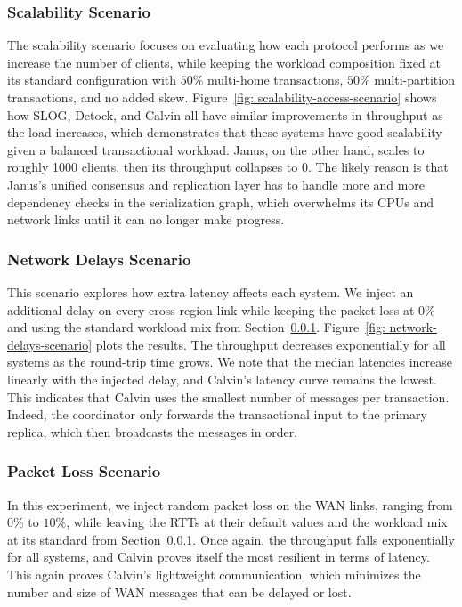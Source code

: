 \subsubsection{Scalability Scenario}
\label{subsubsec: scalability-scenario}
The scalability scenario focuses on evaluating how each protocol performs as we increase the number of clients, while keeping the workload composition fixed at its standard configuration with $50\%$ multi-home transactions, $50\%$ multi-partition transactions, and no added skew. Figure~\ref{fig: scalability-access-scenario} shows how SLOG, Detock, and Calvin all have similar improvements in throughput as the load increases, which demonstrates that these systems have good scalability given a balanced transactional workload. Janus, on the other hand, scales to roughly 1000 clients, then its throughput collapses to 0. The likely reason is that Janus's unified consensus and replication layer has to handle more and more dependency checks in the serialization graph, which overwhelms its CPUs and network links until it can no longer make progress.

\subsubsection{Network Delays Scenario}
\label{subsubsec: network-delays-scenario}
This scenario explores how extra latency affects each system. We inject an additional delay on every cross-region link while keeping the packet loss at $0\%$ and using the standard workload mix from Section~\ref{subsubsec: scalability-scenario}. Figure~\ref{fig: network-delays-scenario} plots the results. The throughput decreases exponentially for all systems as the round-trip time grows. We note that the median latencies increase linearly with the injected delay, and Calvin's latency curve remains the lowest. This indicates that Calvin uses the smallest number of messages per transaction. Indeed, the coordinator only forwards the transactional input to the primary replica, which then broadcasts the messages in order. 

\subsubsection{Packet Loss Scenario}
\label{subsubsec: packet-loss-scenario}
In this experiment, we inject random packet loss on the WAN links, ranging from $0\%$ to $10\%$, while leaving the RTTs at their default values and the workload mix at its standard from Section~\ref{subsubsec: scalability-scenario}. Once again, the throughput falls exponentially for all systems, and Calvin proves itself the most resilient in terms of latency. This again proves Calvin's lightweight communication, which minimizes the number and size of WAN messages that can be delayed or lost.